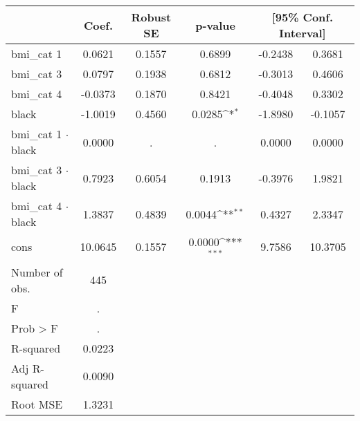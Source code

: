 {
\def\sym#1{\ifmmode^{#1}\else\(^{#1}\)\fi}
\begin{tabular}{l*{1}{ccccc}}
\toprule
            &       Coef.&   Robust SE&     p-value         &\multicolumn{2}{c}{[95\% Conf. Interval]}            \\
\midrule
bmi\_cat 1   &      0.0621&      0.1557&      0.6899         &     -0.2438&      0.3681\\
bmi\_cat 3   &      0.0797&      0.1938&      0.6812         &     -0.3013&      0.4606\\
bmi\_cat 4   &     -0.0373&      0.1870&      0.8421         &     -0.4048&      0.3302\\
black       &     -1.0019&      0.4560&      0.0285\sym{*}  &     -1.8980&     -0.1057\\
bmi\_cat 1 $\cdot$ black&      0.0000&           .&           .         &      0.0000&      0.0000\\
bmi\_cat 3 $\cdot$ black&      0.7923&      0.6054&      0.1913         &     -0.3976&      1.9821\\
bmi\_cat 4 $\cdot$ black&      1.3837&      0.4839&      0.0044\sym{**} &      0.4327&      2.3347\\
cons        &     10.0645&      0.1557&      0.0000\sym{***}&      9.7586&     10.3705\\
\midrule
Number of obs.&         445&            &                     &            &            \\
F           &           .&            &                     &            &            \\
Prob > F    &           .&            &                     &            &            \\
R-squared   &      0.0223&            &                     &            &            \\
Adj R-squared&      0.0090&            &                     &            &            \\
Root MSE    &      1.3231&            &                     &            &            \\
\bottomrule
\end{tabular}
}
